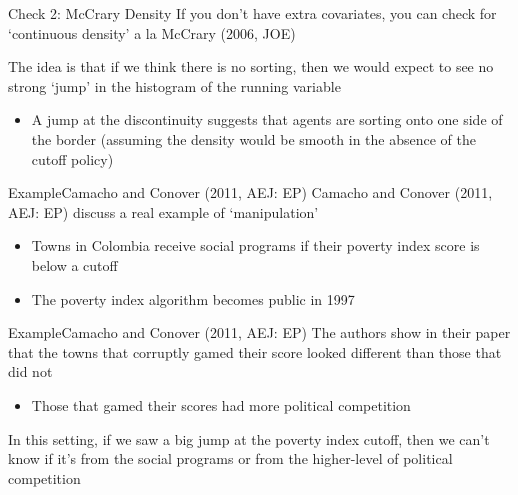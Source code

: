 \documentclass[aspectratio=169,t,11pt,table]{beamer}
\begin{document}

\begin{frame}{Check 2: McCrary Density}{}
  If you don't have extra covariates, you can check for `continuous density' a la McCrary (2006, JOE)

  \bigskip
  The idea is that if we think there is no sorting, then we would expect to see no strong `jump' in the histogram of the running variable
  \begin{itemize}
    \item A jump at the discontinuity suggests that agents are sorting onto one side of the border (assuming the density would be smooth in the absence of the cutoff policy)
  \end{itemize}
\end{frame}


\begin{frame}{Example}{Camacho and Conover (2011, AEJ: EP)}
  Camacho and Conover (2011, AEJ: EP) discuss a real example of `manipulation'
  \begin{itemize}
    \item Towns in Colombia receive social programs if their poverty index score is below a cutoff
     
    \item The poverty index algorithm becomes public in 1997
  \end{itemize}
\end{frame}


\begin{frame}{Example}{Camacho and Conover (2011, AEJ: EP)}
  The authors show in their paper that the towns that corruptly gamed their score looked different than those that did not
  \begin{itemize}
    \item Those that gamed their scores had more political competition
  \end{itemize}

  \bigskip
  In this setting, if we saw a big jump at the poverty index cutoff, then we can't know if it's from the social programs or from the higher-level of political competition 
\end{frame}
\end{document}
